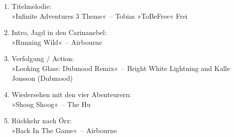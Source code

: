 \begin{enumerate}
    \item Titelmelodie:\\ »Infinite Adventures 3 Theme«~– Tobias »ToBeFree« Frei
    \item Intro, Jagd in den Carinanebel:\\ »Running Wild«~– Airbourne

    \item Verfolgung / Action:\\ »Looking Glass: Dubmood Remix«~– Bright White Lightning and Kalle Jonsson (Dubmood)

    \item Wiedersehen mit den vier Abenteurern:\\ »Shoog Shoog«~– The Hu

    \item Rückkehr nach Örz:\\ »Back In The Game«~– Airbourne


\end{enumerate}
